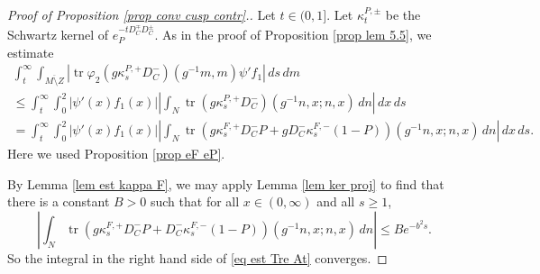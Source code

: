 \documentclass[11pt]{article}
\theoremstyle{plain}
\theoremstyle{definition}
\theoremstyle{remark}
\numberwithin{equation}{section}
\DeclareMathOperator{\tr}{tr}
\begin{document}
\begin{proof}[Proof of Proposition \ref{prop conv cusp contr}.]
Let $t \in (0,1]$.
Let $\kappa_t^{P, \pm}$ be the Schwartz kernel of $e_P^{-t D_C^{\mp}D_C^{\pm}}$.
As in the proof of Proposition \ref{prop lem 5.5}, we estimate
\begin{multline}\label{eq est Tre At}
 \int_t^{\infty}  \int_{\overline{M \setminus Z}} \left| \tr
\varphi_2 (g \kappa_s^{P, +}D_C^-) (g^{-1}m,m)\psi' f_1
 \right|\, ds \, dm \\
 \leq  \int_t^{\infty} \int_0^2  |\psi'(x) f_1(x)| \left| \int_N
  \tr (g \kappa_s^{P, +}D_C^-) (g^{-1}n, x;  n, x)\, dn \right| \,dx \, ds\\
  =
  \int_t^{\infty} \int_0^2  |\psi'(x) f_1(x)| \left| \int_N
  \tr \left(g\kappa_s^{F, +}D_C^- P + gD_C^-\kappa_s^{F, -}(1- P)\right) (g^{-1}n, x;  n, x)\, dn \right| \,dx \, ds.
%
\end{multline}
Here we used  Proposition \ref{prop eF eP}. %

By Lemma \ref{lem est kappa F}, we may apply Lemma \ref{lem ker proj} to find that there is a constant $B>0$ such that for all $x \in (0,\infty)$ and all $s\geq 1$,
\[
\left|
 \int_N
 \tr\left(g\kappa_s^{F, +}D_C^- P + D_C^-\kappa_s^{F, -}(1- P)\right) (g^{-1}n, x;  n, x) \, dn\right| \leq Be^{-b^2 s}.
\]
So the integral in the right hand side of \eqref{eq est Tre At} %
 converges.
%


\end{proof}
\end{document}
